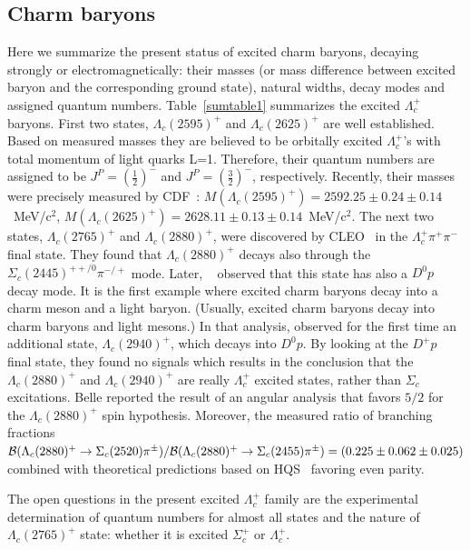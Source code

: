\subsection{Charm baryons}


Here we summarize the present status of excited charm baryons, 
decaying strongly or electromagnetically: their masses (or 
mass difference between excited baryon and the corresponding 
ground state), natural widths, decay modes and 
assigned quantum numbers. 
Table~\ref{sumtable1} summarizes the excited $\Lambda_c^+$ baryons.  
First two states, $\Lambda_c(2595)^+$ and $\Lambda_c(2625)^+$ 
are well established. 
Based on measured masses they are believed to be orbitally 
excited $\Lambda_c^+$'s with total momentum of light quarks 
L=1. Therefore, their quantum numbers are assigned to be 
$J^P=(\frac{1}{2})^-$ and $J^P=(\frac{3}{2})^-$, respectively. Recently, 
their masses 
were precisely measured by CDF~\cite{Aaltonen:2011sf}: 
$M(\Lambda_c(2595)^+)=2592.25\pm 0.24\pm 0.14$~MeV/c$^2$, 
$M(\Lambda_c(2625)^+)=2628.11\pm 0.13\pm 0.14$~MeV/c$^2$. 
The next two states, $\Lambda_c(2765)^+$ and $\Lambda_c(2880)^+$, 
were discovered by CLEO~\cite{Artuso:2000xy} in the $\Lambda_c^+\pi^+\pi^-$ 
final state. 
They found that $\Lambda_c(2880)^+$ decays also through the 
$\Sigma_c(2445)^{++/0}\pi^{-/+}$ mode. 
Later, \babar~\cite{Aubert:2006sp} 
observed that this state has also a $D^0 p$ decay mode. It is the 
first example where excited charm baryons decay into a charm meson 
and a light baryon. (Usually, excited charm baryons decay into charm 
baryons and light mesons.) In that analysis, \babar 
observed for the first time an additional state, $\Lambda_c(2940)^+$, 
which decays into $D^0 p$. By looking at the $D^+ p$ final state, they found 
no signals which results in the conclusion that the $\Lambda_c(2880)^+$ 
and $\Lambda_c(2940)^+$ are really 
$\Lambda_c^+$ excited states, rather than $\Sigma_c$ excitations. 
Belle reported the result of an angular analysis that favors $5/2$ 
for the $\Lambda_c(2880)^+$ spin hypothesis. 
Moreover, the measured ratio of branching fractions 
${\cal B}(\Lambda_c(2880)^+\rightarrow \Sigma_c(2520)\pi^{\pm})/{\cal B}(\Lambda_c(2880)^+\rightarrow \Sigma_c(2455)\pi^{\pm})=(0.225\pm 0.062\pm 0.025)$ combined 
with theoretical predictions based on HQS~\cite{Isgur:1991wq,Cheng:2006dk} 
favoring even parity.     

The open questions in the present excited $\Lambda_c^+$ family are the 
experimental determination of quantum numbers for almost all states and 
the nature of $\Lambda_c(2765)^+$ state: whether it is excited $\Sigma_c^+$ 
or $\Lambda_c^+$.


